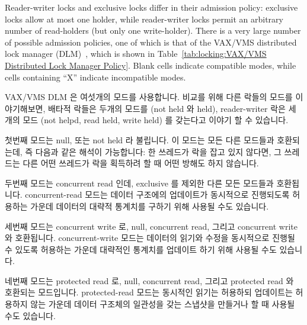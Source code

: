 Reader-writer locks and exclusive locks differ in their admission
policy: exclusive locks allow at most one holder, while reader-writer
locks permit an arbitrary number of read-holders (but only one write-holder).
There is a very large number of possible admission policies, one of
which is that of the VAX/VMS distributed lock
manager (DLM)~\cite{Snaman87}, which is shown in
Table~\ref{tab:locking:VAX/VMS Distributed Lock Manager Policy}.
Blank cells indicate compatible modes, while cells containing ``X''
indicate incompatible modes.
\fi

VAX/VMS DLM 은 여섯개의 모드를 사용합니다.
비교를 위해 다른 락들의 모드를 이야기해보면, 배타적 락들은 두개의 모드를 (not
held 와 held), reader-writer 락은 세개의 모드 (not helpd, read held, write
held) 를 갖는다고 이야기 할 수 있습니다.

첫번째 모드는 null, 또는 not held 라 불립니다.
이 모드는 모든 다른 모드들과 호환되는데, 즉 다음과 같은 해석이 가능합니다:
한 쓰레드가 락을 잡고 있지 않다면, 그 쓰레드는 다른 어떤 쓰레드가 락을 획득하려
할 때 어떤 방해도 하지 않습니다.

두번째 모드는 concurrent read 인데, exclusive 를 제외한 다른 모든 모드들과
호환됩니다.
concurrent-read 모드는 데이터 구조에의 업데이트가 동시적으로 진행되도록
허용하는 가운데 데이터의 대략적 통계치를 구하기 위해 사용될 수도 있습니다.

세번째 모드는 concurrent write 로, null, concurrent read, 그리고 concurrent
write 와 호환됩니다.
concurrent-write 모드는 데이터의 읽기와 수정을 동시적으로 진행될 수 있도록
허용하는 가운데 대략적인 통계치를 업데이트 하기 위해 사용될 수도 있습니다.

네번째 모드는 protected read 로, null, concurrent read, 그리고 protected read
와 호환되는 모드입니다.
protected-read 모드는 동시적인 읽기는 허용하되 업데이트는 허용하지 않는 가운데
데이터 구조체의 일관성을 갖는 스냅샷을 만들거나 할 때 사용될 수도 있습니다.
\iffalse

